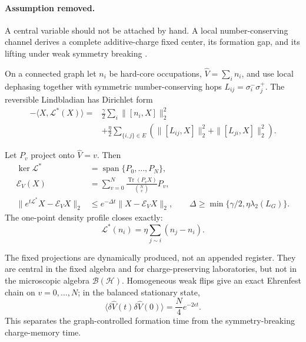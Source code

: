 \paragraph{Assumption removed.}
A central variable should not be attached by hand.  A local
number-conserving channel derives a complete additive-charge fixed
center, its formation gap, and its lifting under weak symmetry breaking
\cite{XuCentral2026}.

On a connected graph let \(n_i\) be hard-core occupations,
\(\widehat V=\sum_i n_i\), and use local dephasing together with symmetric
number-conserving hops \(L_{ij}=\sigma_i^-\sigma_j^+\).  The reversible
Lindbladian has Dirichlet form
\begin{align}
 -\langle X,\mathcal L^*(X)\rangle
 ={}&\frac{\gamma}{2}\sum_i\|[n_i,X]\|_2^2\nonumber\\
 &+\frac{\eta}{2}\sum_{\{i,j\}\in E}
 \left(\|[L_{ij},X]\|_2^2+\|[L_{ji},X]\|_2^2\right).
 \label{eq:loop-center-dirichlet}
\end{align}

\begin{theorem}
\label{thm:loop-center}
Let \(P_v\) project onto \(\widehat V=v\).  Then
\begin{align}
 \ker\mathcal L^*&=\operatorname{span}\{P_0,\ldots,P_N\},\nonumber\\
 \mathcal E_V(X)&=\sum_{v=0}^{N}
 \frac{\operatorname{Tr}(P_vX)}{\binom Nv}P_v,\nonumber\\
 \|e^{t\mathcal L^*}X-\mathcal E_VX\|_2
 &\le e^{-\Delta t}\|X-\mathcal E_VX\|_2,\qquad
 \Delta\ge\min\{\gamma/2,\eta\lambda_2(L_G)\}.
 \label{eq:loop-center-gap}
\end{align}
The one-point density profile closes exactly:
\begin{equation}
 \mathcal L^*(n_i)=\eta\sum_{j\sim i}(n_j-n_i).
 \label{eq:loop-center-heat}
\end{equation}
\end{theorem}

The fixed projections are dynamically produced, not an appended register.
They are central in the fixed algebra and for charge-preserving
laboratories, but not in the microscopic algebra
\(\mathcal B(\mathcal H)\).  Homogeneous weak flips give an exact Ehrenfest
chain on \(v=0,\ldots,N\); in the balanced stationary state,
\begin{equation}
 \langle\delta\widehat V(t)\delta\widehat V(0)\rangle
 =\frac N4e^{-2\epsilon t}.
 \label{eq:loop-center-correlation}
\end{equation}
This separates the graph-controlled formation time from the
symmetry-breaking charge-memory time.

